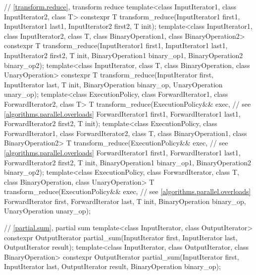 \begin{codeblock}
{  // \ref{transform.reduce}, transform reduce
  template<class InputIterator1, class InputIterator2, class T>
    constexpr T transform_reduce(InputIterator1 first1, InputIterator1 last1,
                                 InputIterator2 first2, T init);
  template<class InputIterator1, class InputIterator2, class T,
           class BinaryOperation1, class BinaryOperation2>
    constexpr T transform_reduce(InputIterator1 first1, InputIterator1 last1,
                                 InputIterator2 first2, T init,
                                 BinaryOperation1 binary_op1, BinaryOperation2 binary_op2);
  template<class InputIterator, class T,
           class BinaryOperation, class UnaryOperation>
    constexpr T transform_reduce(InputIterator first, InputIterator last, T init,
                                 BinaryOperation binary_op, UnaryOperation unary_op);
  template<class ExecutionPolicy,
           class ForwardIterator1, class ForwardIterator2, class T>
    T transform_reduce(ExecutionPolicy&& exec,                  // see \ref{algorithms.parallel.overloads}
                       ForwardIterator1 first1, ForwardIterator1 last1,
                       ForwardIterator2 first2, T init);
  template<class ExecutionPolicy,
           class ForwardIterator1, class ForwardIterator2, class T,
           class BinaryOperation1, class BinaryOperation2>
    T transform_reduce(ExecutionPolicy&& exec,                  // see \ref{algorithms.parallel.overloads}
                       ForwardIterator1 first1, ForwardIterator1 last1,
                       ForwardIterator2 first2, T init,
                       BinaryOperation1 binary_op1, BinaryOperation2 binary_op2);
  template<class ExecutionPolicy, class ForwardIterator, class T,
           class BinaryOperation, class UnaryOperation>
    T transform_reduce(ExecutionPolicy&& exec,                  // see \ref{algorithms.parallel.overloads}
                       ForwardIterator first, ForwardIterator last, T init,
                       BinaryOperation binary_op, UnaryOperation unary_op);

  // \ref{partial.sum}, partial sum
  template<class InputIterator, class OutputIterator>
    constexpr OutputIterator
      partial_sum(InputIterator first, InputIterator last,
                  OutputIterator result);
  template<class InputIterator, class OutputIterator, class BinaryOperation>
    constexpr OutputIterator
      partial_sum(InputIterator first, InputIterator last,
                  OutputIterator result, BinaryOperation binary_op);

}
\end{codeblock}

